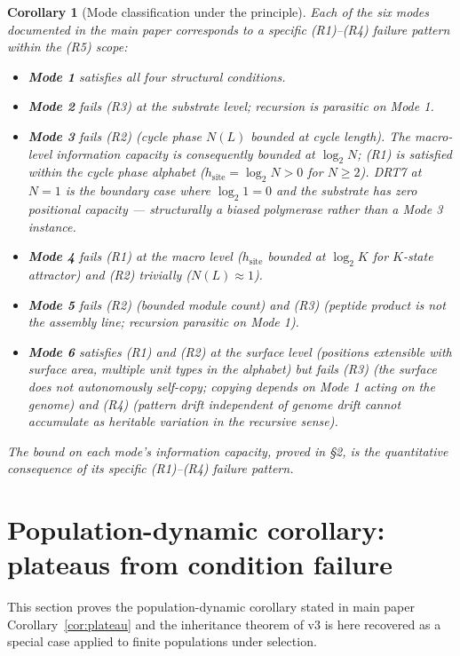 \documentclass[11pt]{article}
\theoremstyle{plain}
\newtheorem{corollary}[theorem]{Corollary}
\theoremstyle{definition}
\begin{document}
\begin{corollary}[Mode classification under the principle]
\label{cor:mode_principle}
Each of the six modes documented in the main paper corresponds to a specific (R1)--(R4) failure pattern within the (R5) scope:
\begin{itemize}
  \item \textbf{Mode 1} satisfies all four structural conditions.
  \item \textbf{Mode 2} fails (R3) at the substrate level; recursion is parasitic on Mode 1.
  \item \textbf{Mode 3} fails (R2) (cycle phase $N(L)$ bounded at cycle length). The macro-level information capacity is consequently bounded at $\log_2 N$; (R1) is satisfied within the cycle phase alphabet ($h_{\mathrm{site}} = \log_2 N > 0$ for $N \ge 2$). DRT7 at $N=1$ is the boundary case where $\log_2 1 = 0$ and the substrate has zero positional capacity --- structurally a biased polymerase rather than a Mode 3 instance.
  \item \textbf{Mode 4} fails (R1) at the macro level ($h_{\mathrm{site}}$ bounded at $\log_2 K$ for $K$-state attractor) and (R2) trivially ($N(L) \approx 1$).
  \item \textbf{Mode 5} fails (R2) (bounded module count) and (R3) (peptide product is not the assembly line; recursion parasitic on Mode 1).
  \item \textbf{Mode 6} satisfies (R1) and (R2) at the surface level (positions extensible with surface area, multiple unit types in the alphabet) but fails (R3) (the surface does not autonomously self-copy; copying depends on Mode 1 acting on the genome) and (R4) (pattern drift independent of genome drift cannot accumulate as heritable variation in the recursive sense).
\end{itemize}
The bound on each mode's information capacity, proved in \S2, is the quantitative consequence of its specific (R1)--(R4) failure pattern.
\end{corollary}


\section{Population-dynamic corollary: plateaus from condition failure}
\label{sec:population_corollary}

This section proves the population-dynamic corollary stated in main paper Corollary~\ref{cor:plateau} and the inheritance theorem of v3 is here recovered as a special case applied to finite populations under selection.
\end{document}
